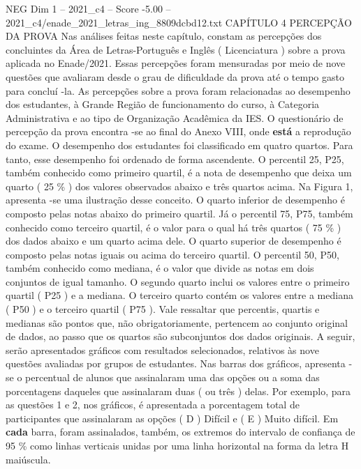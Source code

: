 \begin{textsample}{NEG Dim 1 – 2021\_c4 – Score -5.00 – 2021\_c4/enade\_2021\_letras\_ing\_8809dcbd12.txt}  \label{ex:f1_neg_067}
CAPÍTULO 4 PERCEPÇÃO DA PROVA Nas análises feitas neste capítulo, constam as percepções dos concluintes da Área de Letras-Português e Inglês ( Licenciatura ) sobre a prova aplicada no Enade/2021.
Essas percepções foram mensuradas por meio de nove questões que avaliaram desde o grau de dificuldade da prova até o tempo gasto para concluí -la.
As percepções sobre a prova foram relacionadas ao desempenho dos estudantes, à Grande Região de funcionamento do curso, à Categoria Administrativa e ao tipo de Organização Acadêmica da IES.
O questionário de percepção da prova encontra -se ao final do Anexo VIII, onde \textbf{está} a reprodução do exame.
O desempenho dos estudantes foi classificado em quatro quartos.
Para tanto, esse desempenho foi ordenado de forma ascendente.
O percentil 25, P25, também conhecido como primeiro quartil, é a nota de desempenho que deixa um quarto ( 25 \% ) dos valores observados abaixo e três quartos acima.
Na Figura 1, apresenta -se uma ilustração desse conceito.
O quarto inferior de desempenho é composto pelas notas abaixo do primeiro quartil.
Já o percentil 75, P75, também conhecido como terceiro quartil, é o valor para o qual há três quartos ( 75 \% ) dos dados abaixo e um quarto acima dele.
O quarto superior de desempenho é composto pelas notas iguais ou acima do terceiro quartil.
O percentil 50, P50, também conhecido como mediana, é o valor que divide as notas em dois conjuntos de igual tamanho.
O segundo quarto inclui os valores entre o primeiro quartil ( P25 ) e a mediana.
O terceiro quarto contém os valores entre a mediana ( P50 ) e o terceiro quartil ( P75 ).
Vale ressaltar que percentis, quartis e medianas são pontos que, não obrigatoriamente, pertencem ao conjunto original de dados, ao passo que os quartos são subconjuntos dos dados originais.
A seguir, serão apresentados gráficos com resultados selecionados, relativos às nove questões avaliadas por grupos de estudantes.
Nas barras dos gráficos, apresenta -se o percentual de alunos que assinalaram uma das opções ou a soma das porcentagens daqueles que assinalaram duas ( ou três ) delas.
Por exemplo, para as questões 1 e 2, nos gráficos, é apresentada a porcentagem total de participantes que assinalaram as opções ( D ) Difícil e ( E ) Muito difícil.
Em \textbf{cada} barra, foram assinalados, também, os extremos do intervalo de confiança de 95 \% como linhas verticais unidas por uma linha horizontal na forma da letra H maiúscula.

\end{textsample}
